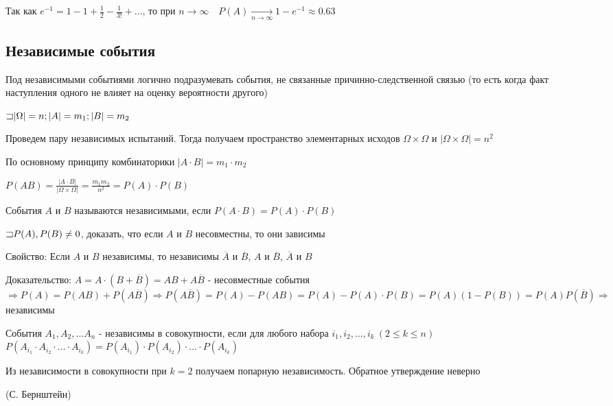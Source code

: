 \documentclass[12pt]{article}
\begin{document}
    Так как $e^{-1} = 1 - 1 + \frac{1}{2} - \frac{1}{3!} + \dots$, то при $n \to \infty \quad P(A) \underset{n \to \infty}{\to} 1 - e^{-1} \approx 0.63$

    \subsection{Независимые события}

    Под независимыми событиями логично подразумевать события, не связанные причинно-следственной связью (то есть когда факт наступления одного не влияет на оценку вероятности другого)

    $\mathord{\sqsupset} |\Omega| = n; |A| = m_1; |B| = m_2$

    Проведем пару независимых испытаний. Тогда получаем пространство элементарных исходов $\Omega \times \Omega$ и $|\Omega \times \Omega| = n^2$

    По основному принципу комбинаторики $|A \cdot B| = m_1 \cdot m_2$

    $P(AB) = \frac{|A \cdot B|}{|\Omega \times \Omega|} = \frac{m_1 m_2}{n^2} = P(A) \cdot P(B)$

    \hypertarget{independantevents}{}

    \Def События $A$ и $B$ называются независимыми, если $P(A \cdot B) = P(A) \cdot P(B)$

    \Lab $\mathord{\sqsupset} P(A), P(B) \neq 0$, доказать, что если $A$ и $B$ несовместны, то они зависимы

    Свойство: Если $A$ и $B$ независимы, то независимы $\overline{A}$ и $\overline{B}$, $A$ и $\overline{B}$, $\overline{A}$ и $B$

    Доказательство: $A = A \cdot (B + \overline{B}) = AB + A\overline{B}$ - несовместные события $\Longrightarrow P(A) = P(AB) + P(A\overline{B}) \Longrightarrow P(A\overline{B}) = P(A) - P(AB) =
    P(A) - P(A) \cdot P(B) = P(A) (1 - P(B)) = P(A) P(\overline{B}) \Longrightarrow$ независимы

    \Def События $A_1, A_2, \dots A_n$ - независимы в совокупности, если для любого набора $i_1, i_2, \dots, i_k \ (2 \leq k \leq n)$
    $P(A_{i_1} \cdot A_{i_2} \cdot \dots \cdot A_{i_k}) = P(A_{i_1}) \cdot P(A_{i_2}) \cdot \dots \cdot P(A_{i_k})$

    \Nota Из независимости в совокупности при $k = 2$ получаем попарную независимость. Обратное утверждение неверно

    \hypertarget{bernshteinsexample}{}

    \Ex (С. Бернштейн)
\end{document}
